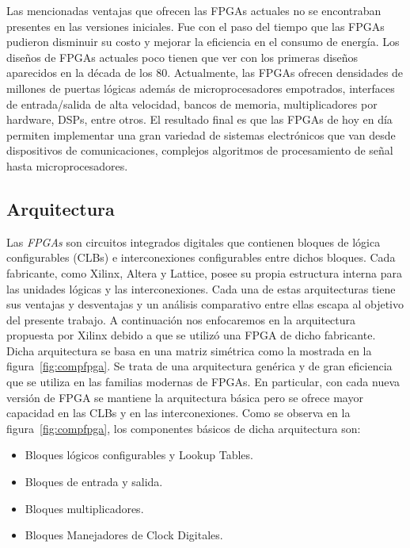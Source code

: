 Las mencionadas ventajas que ofrecen las FPGAs actuales no se
encontraban presentes en las versiones iniciales. Fue con
el paso del tiempo que las FPGAs pudieron disminuir su costo y mejorar
la eficiencia en el consumo de energía. Los diseños de FPGAs actuales
poco tienen que ver con los primeras diseños aparecidos en la década
de los 80. Actualmente, las FPGAs ofrecen densidades de millones de
puertas lógicas además de microprocesadores empotrados, interfaces de
entrada/salida de alta velocidad, bancos de memoria, multiplicadores por
hardware, DSPs, entre otros. El resultado final es que las FPGAs de
hoy en día permiten implementar una gran variedad de sistemas
electrónicos que van desde dispositivos de comunicaciones, complejos
algoritmos de procesamiento de señal hasta microprocesadores.


\subsection{Arquitectura}

Las \textit{FPGAs} son circuitos integrados digitales que contienen
bloques de lógica configurables (CLBs) e interconexiones configurables
entre dichos bloques. Cada fabricante, como Xilinx, Altera y Lattice,
posee su propia estructura interna para las unidades lógicas y las
interconexiones. Cada una de estas arquitecturas tiene sus ventajas y
desventajas y un análisis comparativo entre ellas escapa al objetivo
del presente trabajo. A continuación nos enfocaremos en la
arquitectura propuesta por Xilinx debido a que se utilizó una FPGA de
dicho fabricante. Dicha arquitectura se basa en una matriz simétrica
como la mostrada en la figura~\ref{fig:compfpga}. Se trata de una
arquitectura genérica y de gran eficiencia que se utiliza
en las familias modernas de FPGAs. En particular, con cada nueva
versión de FPGA se mantiene la arquitectura básica pero se ofrece
mayor capacidad en las CLBs y en las interconexiones. Como se observa
en la figura~\ref{fig:compfpga}, los componentes básicos de dicha
arquitectura son:

\begin {itemize}
\item  Bloques lógicos configurables y Lookup Tables.
\item  Bloques de entrada y salida.
\item  Bloques multiplicadores.
\item  Bloques Manejadores de Clock Digitales.
\end {itemize}

